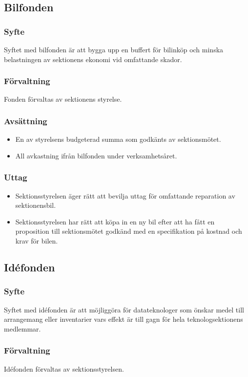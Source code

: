 \documentclass[a4paper, 10pt]{article}
\begin{document}
\subsection{Bilfonden}
\subsubsection{Syfte}
\label{sec:bilfond_syfte}
Syftet med bilfonden är att bygga upp en buffert för bilinköp och minska belastningen av sektionens ekonomi vid omfattande skador.
\subsubsection{Förvaltning}
Fonden förvaltas av sektionens styrelse.
\subsubsection{Avsättning}
\begin{itemize}
\item En av styrelsens budgeterad summa som godkänts av sektionsmötet.
\item All avkastning ifrån bilfonden under verksamhetsåret.
\end{itemize}
\subsubsection{Uttag}
\begin{itemize}
    \item Sektionsstyrelsen äger rätt att bevilja uttag för omfattande reparation av sektionensbil.
    \item Sektionsstyrelsen har rätt att köpa in en ny bil efter att ha fått en proposition till sektionsmötet godkänd med en specifikation på kostnad och krav för bilen.
\end{itemize}

\subsection{Idéfonden}
\subsubsection{Syfte}
\label{sec:idefond_syfte}
Syftet med idéfonden är att möjliggöra för datateknologer som önskar medel till arrangemang eller inventarier vars effekt är till gagn för hela teknologsektionens medlemmar.
\subsubsection{Förvaltning}
Idéfonden förvaltas av sektionsstyrelsen.
\end{document}
